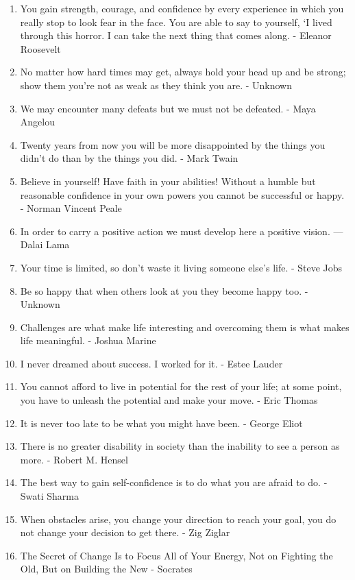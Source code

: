 \begin{enumerate}
            \item You gain strength, courage, and confidence by every experience in which you really stop to look fear in the face. You are able to say to yourself, ‘I lived through this horror. I can take the next thing that comes along. - Eleanor Roosevelt
            \item No matter how hard times may get, always hold your head up and be strong; show them you’re not as weak as they think you are. - Unknown
            \item We may encounter many defeats but we must not be defeated. - Maya Angelou
            \item Twenty years from now you will be more disappointed by the things you didn’t do than by the things you did. - Mark Twain
            \item Believe in yourself! Have faith in your abilities! Without a humble but reasonable confidence in your own powers you cannot be successful or happy. - Norman Vincent Peale
            \item In order to carry a positive action we must develop here a positive vision. — Dalai Lama
            \item Your time is limited, so don't waste it living someone else's life. - Steve Jobs
            \item Be so happy that when others look at you they become happy too. - Unknown
            \item Challenges are what make life interesting and overcoming them is what makes life meaningful. - Joshua Marine
            \item I never dreamed about success. I worked for it. - Estee Lauder
            \item You cannot afford to live in potential for the rest of your life; at some point, you have to unleash the potential and make your move. - Eric Thomas
            \item It is never too late to be what you might have been. - George Eliot
            \item There is no greater disability in society than the inability to see a person as more. - Robert M. Hensel
            \item The best way to gain self-confidence is to do what you are afraid to do. - Swati Sharma
            \item When obstacles arise, you change your direction to reach your goal, you do not change your decision to get there. - Zig Ziglar
            \item The Secret of Change Is to Focus All of Your Energy, Not on Fighting the Old, But on Building the New - Socrates

\end{enumerate}
